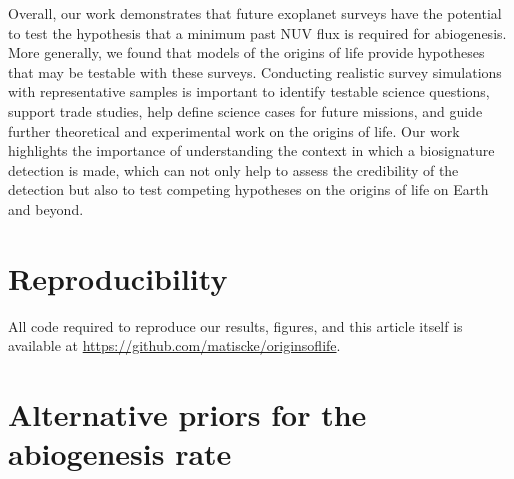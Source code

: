 \documentclass[twocolumn,twocolappendix,linenumbers]{aastex631}
\begin{document}
Overall, our work demonstrates that future exoplanet surveys have the potential to test the hypothesis that a minimum past \gls{NUV} flux is required for abiogenesis.
More generally, we found that models of the origins of life provide hypotheses that may be testable with these surveys.
Conducting realistic survey simulations with representative samples is important to identify testable science questions, support trade studies, help define science cases for future missions, and guide further theoretical and experimental work on the origins of life.
Our work highlights the importance of understanding the context in which a biosignature detection is made, which can not only help to assess the credibility of the detection but also to test competing hypotheses on the origins of life on Earth and beyond.



\section*{Reproducibility}
All code required to reproduce our results, figures, and this article itself is available at \url{https://github.com/matiscke/originsoflife}.


\appendix
\section{Alternative priors for the abiogenesis rate}
\label{sec:appendix-flife-prior}
\end{document}
